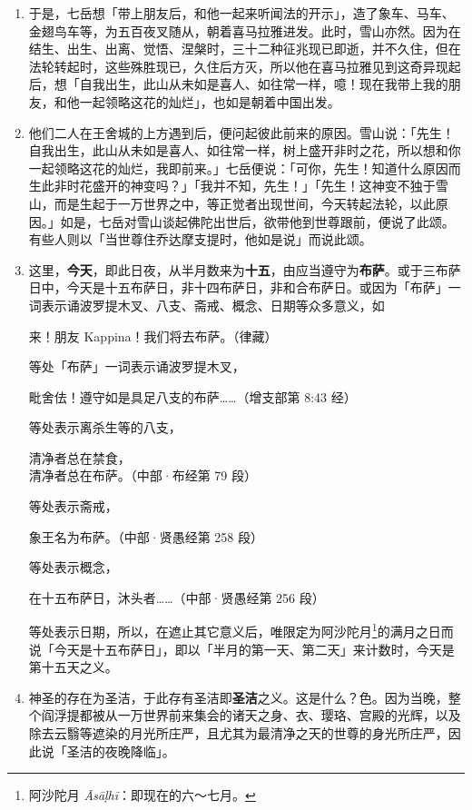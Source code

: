 \begin{enumerate}
\item 于是，七岳想「带上朋友后，和他一起来听闻法的开示」，造了象车、马车、金翅鸟车等，为五百夜叉随从，朝着喜马拉雅进发。此时，雪山亦然。因为在结生、出生、出离、觉悟、涅槃时，三十二种征兆现已即逝，并不久住，但在法轮转起时，这些殊胜现已，久住后方灭，所以他在喜马拉雅见到这奇异现起后，想「自我出生，此山从未如是喜人、如往常一样，噫！现在我带上我的朋友，和他一起领略这花的灿烂」，也如是朝着中国出发。
\item 他们二人在王舍城的上方遇到后，便问起彼此前来的原因。雪山说：「先生！自我出生，此山从未如是喜人、如往常一样，树上盛开非时之花，所以想和你一起领略这花的灿烂，我即前来。」七岳便说：「可你，先生！知道什么原因而生此非时花盛开的神变吗？」「我并不知，先生！」「先生！这神变不独于雪山，而是生起于一万世界之中，等正觉者出现世间，今天转起法轮，以此原因。」如是，七岳对雪山谈起佛陀出世后，欲带他到世尊跟前，便说了此颂。有些人则以「当世尊住乔达摩支提时，他如是说」而说此颂。
\item 这里，\textbf{今天}，即此日夜，从半月数来为\textbf{十五}，由应当遵守为\textbf{布萨}。或于三布萨日中，今天是十五布萨日，非十四布萨日，非和合布萨日。或因为「布萨」一词表示诵波罗提木叉、八支、斋戒、概念、日期等众多意义，如\begin{quoting}来！朋友 Kappina！我们将去布萨。（律藏）\end{quoting}等处「布萨」一词表示诵波罗提木叉，\begin{quoting}毗舍佉！遵守如是具足八支的布萨……（增支部第 8:43 经）\end{quoting}等处表示离杀生等的八支，\begin{quoting}清净者总在禁食，\\清净者总在布萨。（中部·布经第 79 段）\end{quoting}等处表示斋戒，\begin{quoting}象王名为布萨。（中部·贤愚经第 258 段）\end{quoting}等处表示概念，\begin{quoting}在十五布萨日，沐头者……（中部·贤愚经第 256 段）\end{quoting}等处表示日期，所以，在遮止其它意义后，唯限定为阿沙陀月\footnote{阿沙陀月 \textit{Āsāḷhī}：即现在的六～七月。}的满月之日而说「今天是十五布萨日」，即以「半月的第一天、第二天」来计数时，今天是第十五天之义。
\item 神圣的存在为圣洁，于此存有圣洁即\textbf{圣洁}之义。这是什么？色。因为当晚，整个阎浮提都被从一万世界前来集会的诸天之身、衣、璎珞、宫殿的光辉，以及除去云翳等遮染的月光所庄严，且尤其为最清净之天的世尊的身光所庄严，因此说「圣洁的夜晚降临」。

\end{enumerate}
